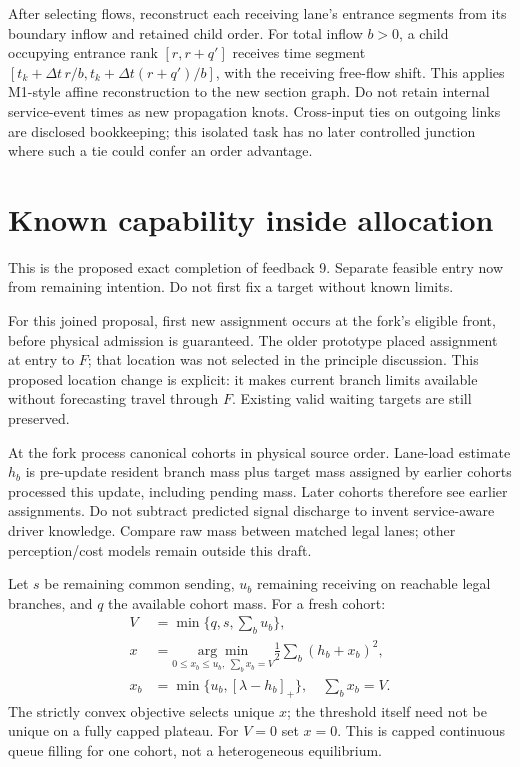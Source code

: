 \documentclass[10pt,a4paper]{article}
\newcommand{\pos}[1]{[#1]_+}
\begin{document}
After selecting flows, reconstruct each receiving lane's entrance segments
from its boundary inflow and retained child order. For total inflow $b>0$,
a child occupying entrance rank $[r,r+q']$ receives time segment
$[t_k+\Delta t\,r/b,t_k+\Delta t(r+q')/b]$, with the receiving free-flow
shift. This applies M1-style affine reconstruction to the new section graph.
Do not retain internal service-event times as new propagation knots.
Cross-input ties on outgoing links are disclosed bookkeeping; this isolated
task has no later controlled junction where such a tie could confer an
order advantage.

\section{Known capability inside allocation}

This is the proposed exact completion of feedback 9. Separate feasible entry
now from remaining intention. Do not first fix a target without known limits.

For this joined proposal, first new assignment occurs at the fork's
eligible front, before physical admission is guaranteed. The older prototype
placed assignment at entry to $F$; that location was not selected in the
principle discussion. This proposed location change is explicit: it makes
current branch limits available without forecasting travel through $F$.
Existing valid waiting targets are still preserved.

At the fork process canonical cohorts in physical source order. Lane-load
estimate $h_b$ is pre-update resident branch mass plus target mass assigned
by earlier cohorts processed this update, including pending mass. Later
cohorts therefore see earlier assignments. Do not subtract predicted signal
discharge to invent service-aware driver knowledge. Compare raw mass between
matched legal lanes; other perception/cost models remain outside this draft.

Let $s$ be remaining common sending, $u_b$ remaining receiving on reachable
legal branches, and $q$ the available cohort mass. For a fresh cohort:
\begin{align}
 V&=\min\{q,s,\sum_bu_b\},\nonumber\\
 x&=\underset{0\leq x_b\leq u_b,\ \sum_bx_b=V}{\arg\min}
                    \frac12\sum_b(h_b+x_b)^2,\nonumber\\
 x_b&=\min\{u_b,\pos{\lambda-h_b}\},\quad \sum_bx_b=V.
 \label{eq:feasible-allocation}
\end{align}
The strictly convex objective selects unique $x$; the threshold itself need
not be unique on a fully capped plateau. For $V=0$ set $x=0$. This is
capped continuous queue filling for one cohort, not a heterogeneous equilibrium.
\end{document}
